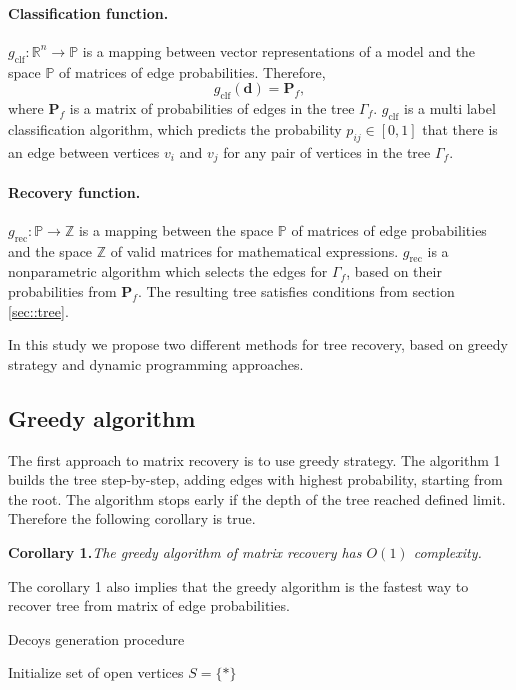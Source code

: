 \documentclass[12pt]{article}
\let\originalparagraph\paragraph
\renewcommand{\paragraph}[2][.]{\originalparagraph{#2#1}}
\begin{document}
\paragraph{Classification function}
$g_\text{clf}: \mathbb{R}^n \rightarrow \mathbb{P}$ is a mapping between vector representations of a model and the space $\mathbb{P}$ of matrices of edge probabilities. Therefore,
\begin{equation}
  g_\text{clf}(\mathbf{d}) = \mathbf{P}_f,
\end{equation}
where $\mathbf{P}_f$ is a matrix of probabilities of edges in the tree $\Gamma_f$. $g_\text{clf}$ is a multi label classification algorithm, which predicts the probability $p_{ij} \in [0, 1]$ that there is an edge between vertices $v_i$ and $v_j$ for any pair of vertices in the tree $\Gamma_f$.

\paragraph{Recovery function}
 $g_\text{rec}: \mathbb{P} \rightarrow \mathbb{Z}$ is a mapping between the space $\mathbb{P}$ of matrices of edge probabilities and the space $\mathbb{Z}$ of valid matrices for mathematical expressions. $g_\text{rec}$ is a nonparametric algorithm which selects the edges for $\Gamma_f$, based on their probabilities from $\mathbf{P}_f$. The resulting tree satisfies conditions from section \ref{sec::tree}.

In this study we propose two different methods for tree recovery, based on greedy strategy and dynamic programming approaches.

\subsection{Greedy algorithm}
The first approach to matrix recovery is to use greedy strategy.
The algorithm 1 builds the tree step-by-step, adding edges with highest probability, starting from the root. The algorithm stops early if the depth of the tree reached defined limit. Therefore the following corollary is true.

\textbf{Corollary 1.}\textit{The greedy algorithm of matrix recovery has $O(1)$ complexity.}

The corollary 1 also implies that the greedy algorithm is the fastest way to recover tree from matrix of edge probabilities.


\begin{algorithm}[!ht]
\caption{Decoys generation procedure}
 Initialize set of open vertices $S = \{*\}$\;
\end{algorithm}
\newpage
\end{document}
